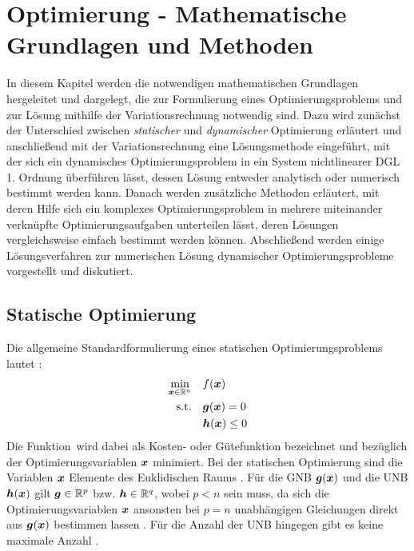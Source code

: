 \chapter{Optimierung - Mathematische Grundlagen und Methoden}\label{cha:Optimierung}
In diesem Kapitel werden die notwendigen mathematischen Grundlagen hergeleitet und dargelegt, die zur Formulierung eines Optimierungsproblems und zur Lösung mithilfe der Variationsrechnung notwendig sind. Dazu wird zunächst der Unterschied zwischen \textit{statischer} und \textit{dynamischer} Optimierung erläutert und anschließend mit der Variationsrechnung eine Lösungsmethode eingeführt, mit der sich ein dynamisches Optimierungsproblem in ein System nichtlinearer \gls{DGL} 1. Ordnung überführen lässt, dessen Lösung entweder analytisch oder numerisch bestimmt werden kann. Danach werden zusätzliche Methoden erläutert, mit deren Hilfe  sich ein komplexes Optimierungsproblem in mehrere miteinander verknüpfte Optimierungsaufgaben unterteilen lässt, deren Lösungen vergleichsweise einfach bestimmt werden können. Abschließend werden einige Lösungsverfahren zur numerischen Lösung dynamischer Optimierungsprobleme vorgestellt und diskutiert. 


\section{Statische Optimierung}\label{sec:statischeOpt}
Die allgemeine Standardformulierung eines statischen Optimierungsproblems lautet \cite{KnutGraichen.2012}:
\begin{align*}
	\min_{\boldsymbol{x}\in\mathbb{R}^n} \quad &f(\boldsymbol{x}) \\
	\textrm{s.t.} \quad&\boldsymbol{g}(\boldsymbol{x}) = 0\\
	&\boldsymbol{h}(\boldsymbol{x}) \leq 0
\end{align*}
Die Funktion \fofx\,wird dabei als Kosten- oder Gütefunktion bezeichnet und bezüglich der Optimierungsvariablen $\boldsymbol{x}$ minimiert. Bei der statischen Optimierung sind die Variablen $\boldsymbol{x}$ Elemente des Euklidischen Raums \cite{KnutGraichen.2012}. Für die \gls{GNB} $\boldsymbol{g}(\boldsymbol{x})$ und die \gls{UNB} $\boldsymbol{h}(\boldsymbol{x})$ gilt $\boldsymbol{g}\in\mathbb{R}^p$ bzw. $\boldsymbol{h}\in\mathbb{R}^q$, wobei $p<n$ sein muss, da sich die Optimierungsvariablen $\boldsymbol{x}$ ansonsten bei $p=n$ unabhängigen Gleichungen direkt aus $\boldsymbol{g}(\boldsymbol{x})$ bestimmen lassen \cite{Papageorgiou.2012}. Für die Anzahl der \gls{UNB} hingegen gibt es keine maximale Anzahl \cite{Papageorgiou.2012}.


